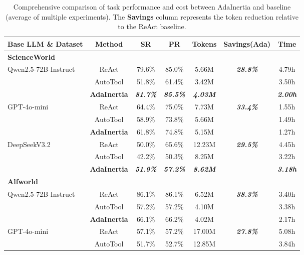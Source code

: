 \documentclass[runningheads]{llncs}
\begin{document}
\begin{table}[htb]
\vspace{-4mm}
\centering
\small
\caption{Comprehensive comparison of task performance and cost between AdaInertia and baseline (average of multiple experiments). The \textbf{Savings} column represents the token reduction relative to the ReAct baseline.}
\begin{tabular}{lcccccc}
\toprule
\textbf{Base LLM \& Dataset} & \textbf{Method} & \textbf{SR} & \textbf{PR} & \textbf{Tokens} & \textbf{Savings(Ada)} & \textbf{Time} \\
\midrule
\textbf{ScienceWorld} & & & & & & \\
\midrule
\multirow{3}{*}{Qwen2.5-72B-Instruct} & ReAct & 79.6\% & 85.0\% & 5.66M & \multirow{3}{*}{\textsl{\textbf{28.8\%}}} & 4.79h\\
& AutoTool & 51.8\% & 61.4\% & 3.42M &  & 3.50h\\
& \textbf{AdaInertia} & \textsl{\textbf{81.7\%}} & \textsl{\textbf{85.5\%}} & \textsl{\textbf{4.03M}} &  & \textsl{\textbf{2.00h}}\\
\midrule
\multirow{3}{*}{GPT-4o-mini} & ReAct & 64.4\% & 75.0\% & 7.73M & \multirow{3}{*}{\textsl{\textbf{33.4\%}}} & 1.55h\\
& AutoTool & 58.9\% & 73.8\% & 5.66M &  & 1.49h\\
& \textbf{AdaInertia} & 61.8\% & 74.8\% & 5.15M &  & 1.27h\\
\midrule
\multirow{3}{*}{DeepSeekV3.2} & ReAct & 50.0\% & 65.6\% & 12.23M & \multirow{3}{*}{\textsl{\textbf{29.5\%}}} & 4.45h\\
& AutoTool & 42.2\% & 50.3\% & 8.25M &  & 3.22h\\
& \textbf{AdaInertia} & \textsl{\textbf{51.9\%}} & \textsl{\textbf{57.2\%}} & \textsl{\textbf{8.62M}} &  & \textsl{\textbf{3.18h}}\\
\midrule
\textbf{Alfworld} & & & & & & \\
\midrule
\multirow{3}{*}{Qwen2.5-72B-Instruct} & ReAct & 86.1\% & 86.1\% & 6.52M & \multirow{3}{*}{\textsl{\textbf{38.3\%}}} & 3.40h\\
& AutoTool & 57.2\% & 57.2\% & 4.10M &  & 3.38h\\
& \textbf{AdaInertia} & 66.1\% & 66.2\% & 4.02M &  & 2.17h\\
\midrule
\multirow{3}{*}{GPT-4o-mini} & ReAct & 57.1\% & 57.2\% & 17.00M & \multirow{3}{*}{\textsl{\textbf{27.8\%}}} & 5.08h\\
& AutoTool & 51.7\% & 52.7\% & 12.85M &  & 3.84h\\

\end{tabular}
\end{table}
\end{document}
